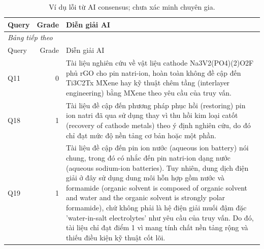 \begingroup\small\setlength{\tabcolsep}{4pt}\renewcommand{\arraystretch}{1.16}
\begin{longtable}{lrp{.77\linewidth}}
\caption{Ví dụ lỗi từ AI consensus; chưa xác minh chuyên gia.}\label{tab:errors}\\
\toprule Query & Grade & Diễn giải AI \\
\midrule\endfirsthead
\multicolumn{3}{l}{\textit{Bảng tiếp theo}}\\
\toprule Query & Grade & Diễn giải AI \\
\midrule\endhead
\bottomrule\endfoot
Q11 & 0 & Tài liệu nghiên cứu về vật liệu cathode Na3V2(PO4)(2)O2F phủ rGO cho pin natri-ion, hoàn toàn không đề cập đến Ti3C2Tx MXene hay kỹ thuật chêm tầng (interlayer engineering) bằng MXene theo yêu cầu của truy vấn. \\
Q18 & 1 & Tài liệu đề cập đến phương pháp phục hồi (restoring) pin ion natri đã qua sử dụng thay vì thu hồi kim loại catốt (recovery of cathode metals) theo ý định nghiên cứu, do đó chỉ đạt mức độ nền tảng cơ bản hoặc một phần. \\
Q19 & 1 & Tài liệu đề cập đến pin ion nước (aqueous ion battery) nói chung, trong đó có nhắc đến pin natri-ion dạng nước (aqueous sodium-ion batteries). Tuy nhiên, dung dịch điện giải ở đây sử dụng dung môi hỗn hợp gồm nước và formamide (organic solvent is composed of organic solvent and water and the organic solvent is strongly polar formamide), chứ không phải là hệ điện giải muối đậm đặc 'water-in-salt electrolytes' như yêu cầu của truy vấn. Do đó, tài liệu chỉ đạt điểm 1 vì mang tính chất nền tảng rộng và thiếu điều kiện kỹ thuật cốt lõi. \\
\end{longtable}\endgroup
{}
